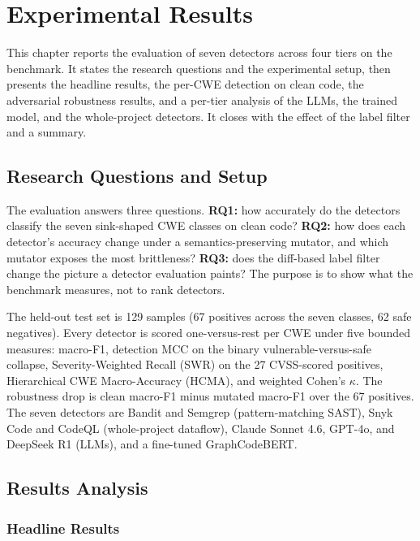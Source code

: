 \chapter{Experimental Results}
\label{ch:results}

This chapter reports the evaluation of seven detectors across four tiers on the
benchmark. It states the research questions and the experimental setup, then
presents the headline results, the per-CWE detection on clean code, the
adversarial robustness results, and a per-tier analysis of the LLMs, the trained
model, and the whole-project detectors. It closes with the effect of the label
filter and a summary.


\section{Research Questions and Setup}

The evaluation answers three questions. \textbf{RQ1:} how accurately do the
detectors classify the seven sink-shaped CWE classes on clean code? \textbf{RQ2:}
how does each detector's accuracy change under a semantics-preserving mutator,
and which mutator exposes the most brittleness? \textbf{RQ3:} does the diff-based
label filter change the picture a detector evaluation paints? The purpose is to
show what the benchmark measures, not to rank detectors.

The held-out test set is 129 samples (67 positives across the seven classes, 62
safe negatives). Every detector is scored one-versus-rest per CWE under five
bounded measures: macro-F1, detection MCC on the binary vulnerable-versus-safe
collapse, Severity-Weighted Recall (SWR) on the 27 CVSS-scored positives,
Hierarchical CWE Macro-Accuracy (HCMA), and weighted Cohen's $\kappa$. The
robustness drop is clean macro-F1 minus mutated macro-F1 over the 67 positives.
The seven detectors are Bandit and Semgrep (pattern-matching SAST), Snyk Code
and CodeQL (whole-project dataflow), Claude Sonnet 4.6, GPT-4o, and DeepSeek R1
(LLMs), and a fine-tuned GraphCodeBERT.

\section{Results Analysis}

\subsection{Headline Results}

